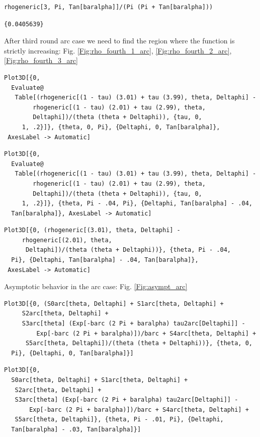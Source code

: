 \documentclass[reqno]{amsart}
\theoremstyle{definition} \newtheorem{definition}{Definition}[section]
\theoremstyle{definition} \newtheorem{remark}[definition]{Remark}
\theoremstyle{plain} \newtheorem{lemma}[definition]{Lemma}
\theoremstyle{plain} \newtheorem{proposition}[definition]{Proposition}
\theoremstyle{plain} \newtheorem{theorem}[definition]{Theorem}
\theoremstyle{plain} \newtheorem{corollary}[definition]{Corollary}
\theoremstyle{definition} \newtheorem{example}[definition]{Example}
\theoremstyle{plain} \newtheorem{claim}[clai]{Claim}
\theoremstyle{definition} \newtheorem{assumption}[definition]{Assumption}
\theoremstyle{definition} \newtheorem{observation}[definition]{Observation}
\newcommand{\1}{\mathbbm 1}
\newcommand{\smed}{\medskip}
\numberwithin{equation}{section} %
\theoremstyle{plain} \newtheorem*{theorem*}{Theorem}
\theoremstyle{plain} \newtheorem{mthm}[maintheorem]{Main Theorem}
\theoremstyle{plain} \newtheorem*{mthm*}{Main Theorem}
\theoremstyle{plain} \newtheorem*{conjecture*}{Conjecture}
\theoremstyle{plain} \newtheorem{conjecture}[definition]{Conjecture}
\theoremstyle{plain} \newtheorem*{problem*}{Problem}
\begin{document}
\begin{verbatim}
rhogeneric[3, Pi, Tan[baralpha]]/(Pi (Pi + Tan[baralpha]))
\end{verbatim}
\begin{verbatim}
{0.0405639}
\end{verbatim}
\smed
After third round arc case we need to find the region where the function is strictly increasing: Fig. \ref{Fig:rho_fourth_1_arc}, \ref{Fig:rho_fourth_2_arc}, \ref{Fig:rho_fourth_3_arc}
\smed
\begin{verbatim}
Plot3D[{0, 
  Evaluate@
   Table[(rhogeneric[(1 - tau) (3.01) + tau (3.99), theta, Deltaphi] -
        rhogeneric[(1 - tau) (2.01) + tau (2.99), theta, 
        Deltaphi])/(theta (theta + Deltaphi)), {tau, 0, 
     1, .2}]}, {theta, 0, Pi}, {Deltaphi, 0, Tan[baralpha]}, 
 AxesLabel -> Automatic]
\end{verbatim}
\begin{verbatim}
Plot3D[{0, 
  Evaluate@
   Table[(rhogeneric[(1 - tau) (3.01) + tau (3.99), theta, Deltaphi] -
        rhogeneric[(1 - tau) (2.01) + tau (2.99), theta, 
        Deltaphi])/(theta (theta + Deltaphi)), {tau, 0, 
     1, .2}]}, {theta, Pi - .04, Pi}, {Deltaphi, Tan[baralpha] - .04, 
  Tan[baralpha]}, AxesLabel -> Automatic]
\end{verbatim}
\begin{verbatim}
Plot3D[{0, (rhogeneric[(3.01), theta, Deltaphi] - 
     rhogeneric[(2.01), theta, 
      Deltaphi])/(theta (theta + Deltaphi))}, {theta, Pi - .04, 
  Pi}, {Deltaphi, Tan[baralpha] - .04, Tan[baralpha]}, 
 AxesLabel -> Automatic]
\end{verbatim}
\smed
Asymptotic behavior in the arc case: Fig. \ref{Fig:asympt_arc}
\smed
\begin{verbatim}
Plot3D[{0, (S0arc[theta, Deltaphi] + S1arc[theta, Deltaphi] + 
     S2arc[theta, Deltaphi] + 
     S3arc[theta] (Exp[-barc (2 Pi + baralpha) tau2arc[Deltaphi]] - 
         Exp[-barc (2 Pi + baralpha)])/barc + S4arc[theta, Deltaphi] +
      S5arc[theta, Deltaphi])/(theta (theta + Deltaphi))}, {theta, 0, 
  Pi}, {Deltaphi, 0, Tan[baralpha]}]
\end{verbatim}
\begin{verbatim}
Plot3D[{0, 
  S0arc[theta, Deltaphi] + S1arc[theta, Deltaphi] + 
   S2arc[theta, Deltaphi] + 
   S3arc[theta] (Exp[-barc (2 Pi + baralpha) tau2arc[Deltaphi]] - 
       Exp[-barc (2 Pi + baralpha)])/barc + S4arc[theta, Deltaphi] + 
   S5arc[theta, Deltaphi]}, {theta, Pi - .01, Pi}, {Deltaphi, 
  Tan[baralpha] - .03, Tan[baralpha]}]
\end{verbatim}
\end{document}

